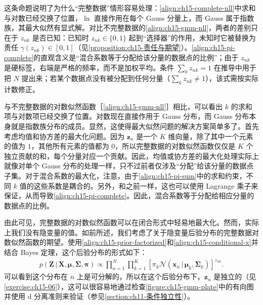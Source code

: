 \documentclass[../../main.tex]{subfiles}
\begin{document}
\begin{remark}
这条命题说明了为什么“完整数据”情形容易处理：\eqref{align:ch15-complete-nll}中求和与对数已经交换了位置，$\ln$ 直接作用在每个 Gauss 分量上，而 Gauss 属于指数族，其最大似然有显式解。对比不完整数据的\eqref{align:ch15-gmm-nll}，两者的差别只在于 $z_{nk}$ 是否已知：已知时 $z_{nk}\in\{0,1\}$ 起到“选择器”的作用，未知时它被替换为责任 $\gamma(z_{nk})\in[0,1]$（见\cref{proposition:ch15-责任与期望}）。\eqref{align:ch15-pi-complete}的直观含义是“混合系数等于分配给该分量的数据点的比例”；由于 $z_{nk}$ 是硬标签，右端是严格的频率，而不是加权平均。条件 $\sum_kz_{nk}=1$ 在推导中用于把 $N$ 提出来；若某个数据点没有被分配到任何分量（$\sum_kz_{nk}\neq1$），该式需按实际计数修正。
\end{remark}

与不完整数据的对数似然函数［\eqref{align:ch15-gmm-nll}］相比，可以看出 $k$ 的求和项与对数项已经交换了位置。对数现在直接作用于 Gauss 分布，而 Gauss 分布本身就是指数族分布的成员。显然，这使得最大似然问题的解决方案简单多了。首先考虑均值和协方差的最大化问题。因为 $\bm{z}_n$ 是一个 $K$ 维向量，除了其中一个元素的值为 $1$，其他所有元素的值都为 $0$，所以完整数据的对数似然函数仅仅是 $K$ 个独立贡献的和，每个分量对应一个贡献。因此，均值或协方差的最大化处理实际上就像对单个 Gauss 分布的处理一样，只不过前者仅涉及“分配”给该分量的数据点子集。对于混合系数的最大化，注意，由于\eqref{align:ch15-pi-sum}中的求和约束，不同 $k$ 值的这些系数是耦合的。另外，和之前一样，这也可以使用 Lagrange 乘子来保证，从而导致\eqref{align:ch15-pi-complete}。因此，混合系数等于分配给相应分量的数据点的比例。

由此可见，完整数据的对数似然函数可以在闭合形式中轻易地最大化。然而，实际上我们没有隐变量的值。如前所述，我们考虑了关于隐变量后验分布的完整数据对数似然函数的期望。使用\eqref{align:ch15-prior-factorized}和\eqref{align:ch15-conditional-x}并结合 Bayes 定理，这个后验分布的形式如下：
\begin{align}
p(\bm{Z}\,|\,\bm{X},\bm{\mu},\bm{\Sigma},\bm{\pi})\propto\prod_{n=1}^{N}\prod_{k=1}^{K}\left[\pi_k\mathcal{N}(\bm{x}_n\,|\,\bm{\mu}_k,\bm{\Sigma}_k)\right]^{z_{nk}}.
\label{align:ch15-posterior}
\end{align}
可以看到这个分布在 $n$ 上是可分解的，所以在这个后验分布下，$\bm{z}_n$ 是独立的（见\cref{exercise:ch15-06}），这可以很容易地通过检查\cref{figure:ch15-gmm-plate}中的有向图并使用 d 分离准则来验证（参见\cref{section:ch11-条件独立性}）。
\end{document}
